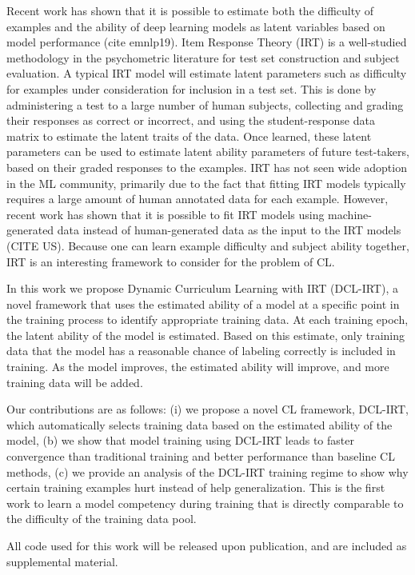 \documentclass{article}
\begin{document}
Recent work has shown that it is possible to estimate both the difficulty of examples and the ability of deep learning models as latent variables based on model performance (cite emnlp19).
Item Response Theory (IRT) is a well-studied methodology in the psychometric literature for test set construction and subject evaluation.
A typical IRT model will estimate latent parameters such as difficulty for examples under consideration for inclusion in a test set.
This is done by administering a test to a large number of human subjects, collecting and grading their responses as correct or incorrect, and using the student-response data matrix to estimate the latent traits of the data.
Once learned, these latent parameters can be used to estimate latent ability parameters of future test-takers, based on their graded responses to the examples.
IRT has not seen wide adoption in the ML community, primarily due to the fact that fitting IRT models typically requires a large amount of human annotated data for each example.
However, recent work has shown that it is possible to fit IRT models using machine-generated data instead of human-generated data as the input to the IRT models (CITE US).
Because one can learn example difficulty and subject ability together, IRT is an interesting framework to consider for the problem of CL. 

In this work we propose Dynamic Curriculum Learning with IRT (DCL-IRT), a novel framework that uses the estimated ability of a model at a specific point in the training process to identify appropriate training data.
At each training epoch, the latent ability of the model is estimated.
Based on this estimate, only training data that the model has a reasonable chance of labeling correctly is included in training.
As the model improves, the estimated ability will improve, and more training data will be added.

Our contributions are as follows: (i) we propose a novel CL framework, DCL-IRT, which automatically selects training data based on the estimated ability of the model, (b) we show that model training using DCL-IRT leads to faster convergence than traditional training and better performance than baseline CL methods, (c) we provide an analysis of the DCL-IRT training regime to show why certain training examples hurt instead of help generalization.
This is the first work to learn a model competency during training that is directly comparable to the difficulty of the training data pool.

All code used for this work will be released upon publication, and are included as supplemental material.
\end{document}
